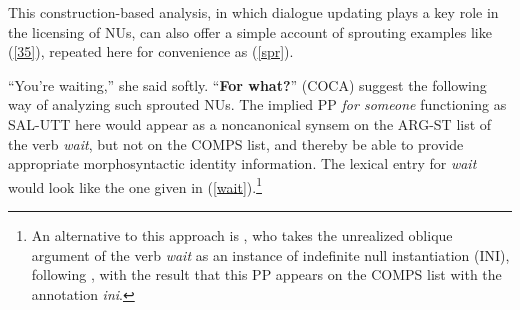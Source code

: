 \documentclass[output=paper
                ,modfonts
                ,nonflat
	        ,collection
	        ,collectionchapter
	        ,collectiontoclongg
 	        ,biblatex
                ,babelshorthands
                ,newtxmath
                ,draftmode
                ,colorlinks, citecolor=brown
]{./langsci/langscibook}
\begin{document}
{This construction-based analysis, in which dialogue updating plays
a key role in the licensing of NUs, can also offer a simple account of sprouting examples like (\ref{35}), repeated here for convenience as (\ref{spr}).

\ea ``You're waiting,'' she said softly. ``\textbf{For what?}'' (COCA) \label{spr} \z
%
\citet[331]{Ginzburg:Sag:2000} suggest the following way of analyzing such sprouted NUs. The implied PP \textit{for someone} functioning as SAL-UTT here would appear as a noncanonical synsem on the ARG-ST list of the verb \textit{wait}, but not on the COMPS list, and thereby be able to provide appropriate morphosyntactic identity information. The lexical entry for \textit{wait} would look like the one given in (\ref{wait}).\footnote{An alternative to this approach is \citet{Kim2015}, who takes the unrealized oblique argument of the verb \textit{wait} as an instance of indefinite null instantiation (INI), following \citep[see][]{Ruppenhofer2014}, with the result that this PP appears on the COMPS list with the annotation \textit{ini}.}


}
\end{document}
